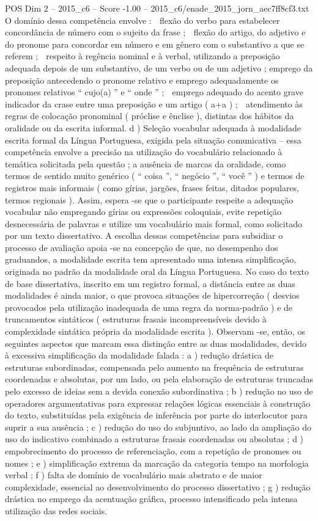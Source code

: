 \begin{textsample}{POS Dim 2 – 2015\_c6 – Score -1.00 – 2015\_c6/enade\_2015\_jorn\_aec7ff8cf3.txt}
O domínio dessa competência envolve :  flexão do verbo para estabelecer concordância de número com o sujeito da frase ;  flexão do artigo, do adjetivo e do pronome para concordar em número e em gênero com o substantivo a que se referem ;  respeito à regência nominal e à verbal, utilizando a preposição adequada depois de um substantivo, de um verbo ou de um adjetivo ; emprego da preposição antecedendo o pronome relativo e emprego adequadamente os pronomes relativos “ cujo(a) ” e “ onde ” ;  emprego adequado do acento grave indicador da crase entre uma preposição e um artigo ( a+a ) ;  atendimento às regras de colocação pronominal ( próclise e ênclise ), distintas dos hábitos da oralidade ou da escrita informal. d ) Seleção vocabular adequada à modalidade escrita formal da Língua Portuguesa, exigida pela situação comunicativa – essa competência envolve a precisão na utilização do vocabulário relacionado à temática solicitada pela questão ; a ausência de marcas da oralidade, como termos de sentido muito genérico ( “ coisa ”, “ negócio ”, “ você ” ) e termos de registros mais informais ( como gírias, jargões, frases feitas, ditados populares, termos regionais ).
Assim, espera -se que o participante respeite a adequação vocabular não empregando gírias ou expressões coloquiais, evite repetição desnecessária de palavras e utilize um vocabulário mais formal, como solicitado por um texto dissertativo.
A escolha dessas competências para subsidiar o processo de avaliação apoia -se na concepção de que, no desempenho dos graduandos, a modalidade escrita tem apresentado uma intensa simplificação, originada no padrão da modalidade oral da Língua Portuguesa.
No caso do texto de base dissertativa, inscrito em um registro formal, a distância entre as duas modalidades é ainda maior, o que provoca situações de hipercorreção ( desvios provocados pela utilização inadequada de uma regra da norma-padrão ) e de truncamentos sintáticos ( estruturas frasais incompreensíveis devido à complexidade sintática própria da modalidade escrita ).
Observam -se, então, os seguintes aspectos que marcam essa distinção entre as duas modalidades, devido à excessiva simplificação da modalidade falada : a ) redução drástica de estruturas subordinadas, compensada pelo aumento na frequência de estruturas coordenadas e absolutas, por um lado, ou pela elaboração de estruturas truncadas pelo excesso de ideias sem a devida conexão subordinativa ; b ) redução no uso de operadores argumentativas para expressar relações lógicas essenciais à construção do texto, substituídas pela exigência de inferência por parte do interlocutor para suprir a sua ausência ; c ) redução do uso do subjuntivo, ao lado da ampliação do uso do indicativo combinado a estruturas frasais coordenadas ou absolutas ; d ) empobrecimento do processo de referenciação, com a repetição de pronomes ou nomes ; e ) simplificação extrema da marcação da categoria tempo na morfologia verbal ; f ) falta de domínio de vocabulário mais abstrato e de maior complexidade, essencial ao desenvolvimento do processo dissertativo ; g ) redução drástica no emprego da acentuação gráfica, processo intensificado pela intensa utilização das redes sociais.

\end{textsample}
